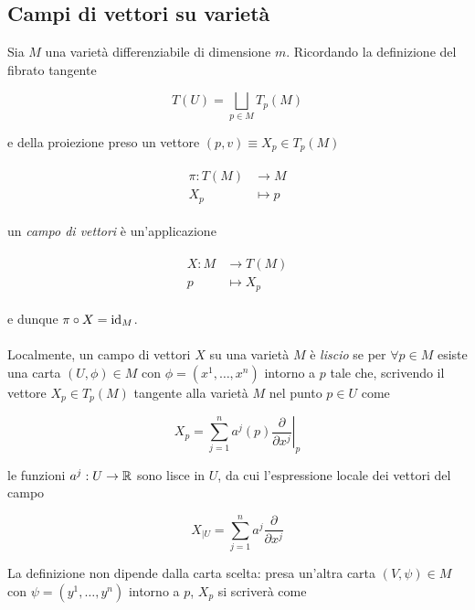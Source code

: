 \subsection{Campi di vettori su varietà}

Sia $ M $ una varietà differenziabile di dimensione $ m $. Ricordando la definizione del fibrato tangente

\begin{equation}
	T(U) = \bigsqcup_{p \in M} T_{p}(M)
\end{equation}

e della proiezione preso un vettore $ (p,v) \equiv X_{p} \in T_{p}(M) $

\begin{align}
	\begin{split}
		\pi : T(M) &\to M\\
		X_{p} &\mapsto p
	\end{split}
\end{align}

un \textit{campo di vettori} è un'applicazione

\begin{align}
	\begin{split}
		X : M &\to T(M)\\
		p &\mapsto X_{p}
	\end{split}
\end{align}

e dunque $ \pi \circ X = \operatorname{id}_{M} $.\\\\
%
Localmente, un campo di vettori $ X $ su una varietà $ M $ è \textit{liscio} se per $ \forall p \in M $ esiste una carta $ (U,\phi) \in M $ con $ \phi = (x^{1},\dots,x^{n}) $ intorno a $ p $ tale che, scrivendo il vettore $ X_{p} \in T_{p}(M) $ tangente alla varietà $ M $ nel punto $ p \in U $ come

\begin{equation}
	X_{p} = \sum_{j=1}^{n} a^{j}(p) \left. \dfrac{\partial}{\partial x^{j}} \right|_{p} 
\end{equation}

le funzioni $ a^{j} : U \to \mathbb{R} $ sono lisce in $ U $, da cui l'espressione locale dei vettori del campo

\begin{equation}
	X_{|U} = \sum_{j=1}^{n} a^{j} \dfrac{\partial}{\partial x^{j}}
\end{equation}

La definizione non dipende dalla carta scelta: presa un'altra carta $ (V,\psi) \in M $ con $ \psi = (y^{1},\dots,y^{n}) $ intorno a $ p $, $ X_{p} $ si scriverà come

